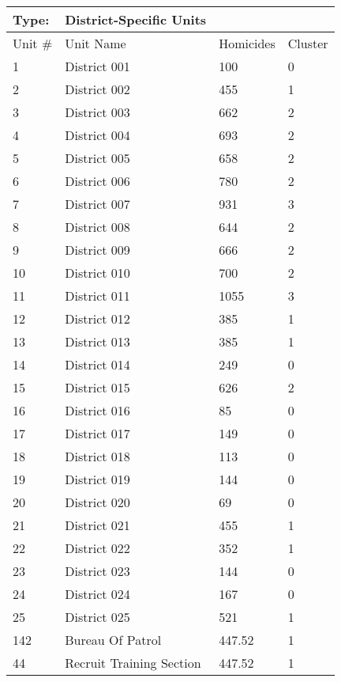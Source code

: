 \begin{table}
\tiny
\centering
\caption{}\label{tab:district}
\begin{tabular}{|llll|}
\hline
Type: &	\textbf{District-Specific Units}  & &\\
\hline
Unit \# &Unit Name & Homicides & Cluster  \\
\hline
1	&District 001	&100	&0\\
2	&District 002	&455	&1\\
3	&District 003	&662	&2\\
4	&District 004	&693	&2\\
5	&District 005	&658	&2\\
6	&District 006	&780	&2\\
7	&District 007	&931	&3\\
8	&District 008	&644	&2\\
9	&District 009	&666	&2\\
10	&District 010	&700	&2\\
11	&District 011	&1055	&3\\
12	&District 012	&385	&1\\
13	&District 013	&385	&1\\
14	&District 014	&249	&0\\
15	&District 015	&626	&2\\
16	&District 016	&85	&0\\
17	&District 017	&149	&0\\
18	&District 018	&113	&0\\
19	&District 019	&144	&0\\
20	&District 020	&69	&0\\
21	&District 021	&455	&1\\
22	&District 022	&352	&1\\
23	&District 023	&144	&0\\
24	&District 024	&167	&0\\
25	&District 025	&521	&1\\
142	&Bureau Of Patrol	&447.52	&1\\
44	&Recruit Training Section	&447.52	&1\\
\hline
\end{tabular}
\end{table}


